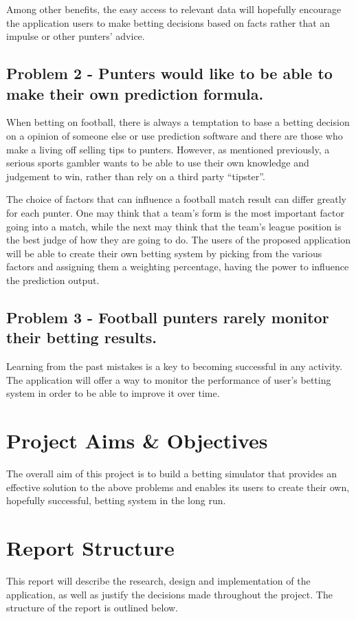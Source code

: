 Among other benefits, the easy access to relevant data will hopefully encourage the application users to make betting decisions based on facts rather that an impulse or other punters’ advice.

\subsection*{Problem 2 - Punters would like to be able to make their own prediction formula.}
When betting on football, there is always a temptation to base a betting decision on a opinion of someone else or use prediction software and there are those who make a living off selling tips to punters. However, as mentioned previously, a serious sports gambler wants to be able to use their own knowledge and judgement to win, rather than rely on a third party “tipster”.

The choice of factors that can influence a football match result can differ greatly for each punter. One may think that a team’s form is the most important factor going into a match, while the next may think that the team’s league position is the best judge of how they are going to do. The users of the proposed application will be able to create their own betting system by picking from the various factors and assigning them a weighting percentage, having the power to influence the prediction output.

\subsection*{Problem 3 - Football punters rarely monitor their betting results.}
Learning from the past mistakes is a key to becoming successful in any activity. The application will offer a way to monitor the performance of user's betting system in order to be able to improve it over time.

\section{Project Aims \& Objectives}
\label{sec:objectives_intro}
The overall aim of this project is to build a betting simulator that provides an effective solution to the above problems and enables its users to create their own, hopefully successful, betting system in the long run.

\section{Report Structure}
\label{sec:reportstructure_intro}
This report will describe the research, design and implementation of the application, as well as justify the decisions made throughout the project.
The structure of the report is outlined below.

